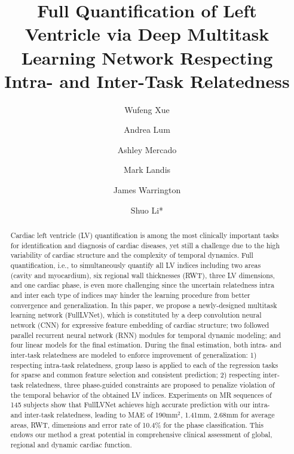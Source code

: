 \documentclass{llncs}
\begin{document}
\mainmatter              %
\title{Full Quantification of Left Ventricle via Deep Multitask Learning Network Respecting \\Intra- and Inter-Task Relatedness}

\author{Wufeng Xue \and Andrea Lum \and Ashley Mercado \and Mark Landis \and James Warrington \and Shuo Li*}

\maketitle              %


\begin{abstract}
Cardiac left ventricle (LV) quantification is among the most clinically important tasks for identification and diagnosis of cardiac diseases, yet still a challenge due to the high variability of cardiac structure and the complexity of temporal dynamics. Full quantification, i.e., to simultaneously quantify all LV indices including two areas (cavity and myocardium), six regional wall thicknesses (RWT), three LV dimensions, and one cardiac phase, is even more challenging since the uncertain relatedness intra and inter each type of indices may hinder the learning procedure from better convergence and generalization. 
In this paper, we propose a newly-designed multitask learning network (FullLVNet), which is constituted by a deep convolution neural network (CNN) for expressive feature embedding of cardiac structure; two followed parallel recurrent neural network (RNN) modules for temporal dynamic modeling; and four linear models for the final estimation. During the final estimation, both intra- and inter-task relatedness are modeled to enforce improvement of generalization: 1) respecting intra-task relatedness, group lasso is applied to each of the regression tasks for sparse and common feature selection and consistent prediction; 2) respecting inter-task relatedness, three phase-guided constraints are proposed to penalize violation of the temporal behavior of the obtained LV indices. Experiments on MR sequences of 145 subjects show that FullLVNet achieves high accurate prediction with our intra- and inter-task relatedness, leading to MAE of 190mm$^2$, 1.41mm, 2.68mm for average areas, RWT, dimensions and error rate of 10.4\% for the phase classification. This endows our method a great potential in comprehensive clinical assessment of global, regional and dynamic cardiac function.

\end{abstract}
\end{document}
